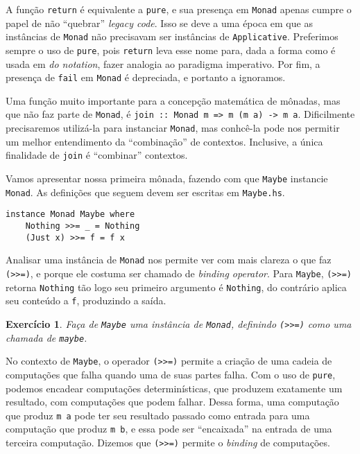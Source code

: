 \documentclass[a4paper]{article}
\newtheorem{exercicio}{Exercício}
\begin{document}
A função \texttt{return} é equivalente a \texttt{pure}, e sua presença em \texttt{Monad} apenas cumpre o papel de não ``quebrar'' \emph{legacy code}.
Isso se deve a uma época em que as instâncias de \texttt{Monad} não precisavam ser instâncias de \texttt{Applicative}.
Preferimos sempre o uso de \texttt{pure}, pois \texttt{return} leva esse nome para, dada a forma como é usada em \emph{do notation}, fazer analogia ao paradigma imperativo.
Por fim, a presença de \texttt{fail} em \texttt{Monad} é depreciada, e portanto a ignoramos.

Uma função muito importante para a concepção matemática de mônadas, mas que não faz parte de \texttt{Monad}, é \texttt{join :: Monad m => m (m a) -> m a}.
Dificilmente precisaremos utilizá-la para instanciar \texttt{Monad}, mas conhcê-la pode nos permitir um melhor entendimento da ``combinação'' de contextos.
Inclusive, a única finalidade de \texttt{join} é ``combinar'' contextos.

Vamos apresentar nossa primeira mônada, fazendo com que \texttt{Maybe} instancie \texttt{Monad}.
As definições que seguem devem ser escritas em \texttt{Maybe.hs}.

\begin{verbatim}
instance Monad Maybe where
	Nothing >>= _ = Nothing
	(Just x) >>= f = f x
\end{verbatim}

Analisar uma instância de \texttt{Monad} nos permite ver com mais clareza o que faz \texttt{(>>=)}, e porque ele costuma ser chamado de \emph{binding operator}.
Para \texttt{Maybe}, \texttt{(>>=)} retorna \texttt{Nothing} tão logo seu primeiro argumento é \texttt{Nothing}, do contrário aplica seu conteúdo a \texttt{f}, produzindo a saída.

\begin{exercicio}
	Faça de \emph{\texttt{Maybe}} uma instância de \emph{\texttt{Monad}}, definindo \emph{\texttt{(>>=)}} como uma chamada de \emph{\texttt{maybe}}.
\end{exercicio}

No contexto de \texttt{Maybe}, o operador \texttt{(>>=)} permite a criação de uma cadeia de computações que falha quando uma de suas partes falha.
Com o uso de \texttt{pure}, podemos encadear computações determinísticas, que produzem exatamente um resultado, com computações que podem falhar.
Dessa forma, uma computação que produz \texttt{m a} pode ter seu resultado passado como entrada para uma computação que produz \texttt{m b}, e essa pode ser ``encaixada'' na entrada de uma terceira computação.
Dizemos que \texttt{(>>=)} permite o \emph{binding} de computações.
\end{document}
